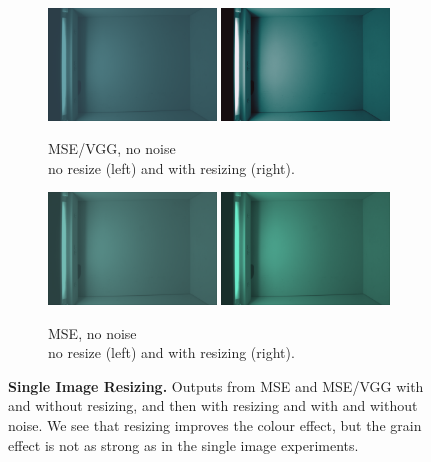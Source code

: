 \begin{figure}[ht]
    \centering

    \begin{subfigure}[b]{0.49\textwidth}
        \centering
        \includegraphics[width=0.49\textwidth]{figures/mse-vgg-no-noise-no-resize-single.png}
        \includegraphics[width=0.49\textwidth]{figures/mse-vgg-no-noise-resize-single.png}
        \captionsetup{justification=centering}
        \caption{MSE/VGG, no noise \\ no resize (left) and with resizing (right).}
    \end{subfigure}
    \hfill
    \begin{subfigure}[b]{0.49\textwidth}
        \centering
        \includegraphics[width=0.49\textwidth]{figures/mse-no-noise-no-resize-single.png}
        \includegraphics[width=0.49\textwidth]{figures/mse-no-noise-resize-single.png}
        \captionsetup{justification=centering}
        \caption{MSE, no noise \\ no resize (left) and with resizing (right).} 
    \end{subfigure}
    \caption{\textbf{Single Image Resizing.} Outputs from MSE and MSE/VGG with and without resizing, and then with resizing and with and without noise. We see that resizing improves the colour effect, but the grain effect is not as strong as in the single image experiments.}
    \label{fig:single-image-resize}
\end{figure}
